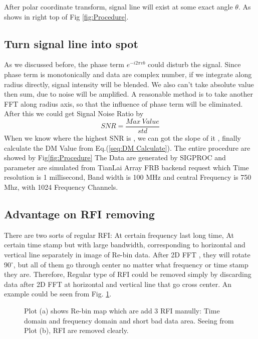 \documentclass[twocolumn]{aastex61}
\begin{document}
 After polar coordinate transform, signal line will exist at some exact angle $\theta$. As shows in right top of Fig \ref{fig:Procedure}. 

\subsection{Turn signal line into spot}
As we discussed before, the phase term $e^{-i2\pi vb}$ could disturb the signal. Since phase term is monotonically and data are complex number, if we integrate along radius directly, signal intensity will be blended. We also can't take absolute value then sum,  due to noise will be amplified. A reasonable method is to take another FFT along radius axis, so that the influence of phase term will be eliminated.
After this we could get Signal Noise Ratio by 
\begin{equation*}
SNR = \frac{Max~Value }{std}
\end{equation*}
When we know where the highest SNR is , we can got the slope of it , finally calculate the DM Value from Eq.(\ref{seq:DM Calculate}). 
The entire procedure are showed by Fig\ref{fig:Procedure} The Data are generated by SIGPROC and parameter are simulated from TianLai Array FRB backend request which Time resolution is 1 millisecond, Band width is 100 MHz and central Frequency is 750 Mhz,  with 1024 Frequency Channels.


\subsection{Advantage on RFI removing}
There are two sorts of regular RFI: At certain frequency last long time, At certain time stamp but with large bandwidth, corresponding to horizontal and vertical line separately in image of Re-bin data. After 2D FFT , they will rotate 90$^{\circ}$, but all of them go through center no matter what frequency or time stamp they are. Therefore, Regular type of RFI could be removed simply by discarding data after 2D FFT at horizontal and vertical line that go cross center.%
An example could be seen from Fig. \ref{fig:RFI remove}.

\begin{figure}[ht!]
\centering
{}
\caption{Plot (a) shows Re-bin map which are add 3 RFI manully: Time domain and frequency domain and short bad data area. Seeing from Plot (b), RFI are removed clearly.  \label{fig:RFI remove}}
\end{figure}
\end{document}
